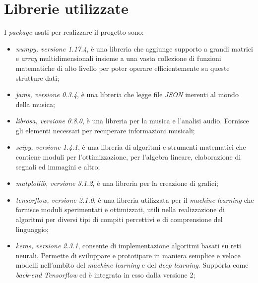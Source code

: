 \section{Librerie utilizzate}
I \textit{package} usati per realizzare il progetto sono:
\begin{itemize}
	\item \textit{numpy, versione 1.17.4}, è una libreria che aggiunge supporto a grandi matrici e \textit{array} multidimensionali insieme a una vasta collezione di funzioni matematiche di alto livello per poter operare efficientemente su queste strutture dati;
	\item \textit{jams, versione 0.3.4}, è una libreria che legge file \textit{JSON} inerenti al mondo della musica;
	\item \textit{librosa, versione 0.8.0}, è una libreria per la musica e l'analisi audio. Fornisce gli elementi necessari per recuperare informazioni musicali;
	\item \textit{scipy, versione 1.4.1}, è una libreria di algoritmi e strumenti matematici che contiene moduli per l'ottimizzazione, per l'algebra lineare, elaborazione di segnali ed immagini e altro;
	\item \textit{matplotlib, versione 3.1.2}, è una libreria per la creazione di grafici;
	\item \textit{tensorflow, versione 2.1.0}, è una libreria utilizzata per il \textit{machine learning} che fornisce moduli sperimentati e ottimizzati, utili nella realizzazione di algoritmi per diversi tipi di compiti percettivi e di comprensione del linguaggio;
	\item \textit{keras, versione 2.3.1}, consente di implementazione algoritmi basati su reti neurali. Permette di sviluppare e prototipare in maniera semplice e veloce modelli nell’ambito del \textit{machine learning} e del \textit{deep learning}. Supporta come \textit{back-end} \textit{Tensorflow} ed è integrata in esso dalla versione 2;
\end{itemize}

